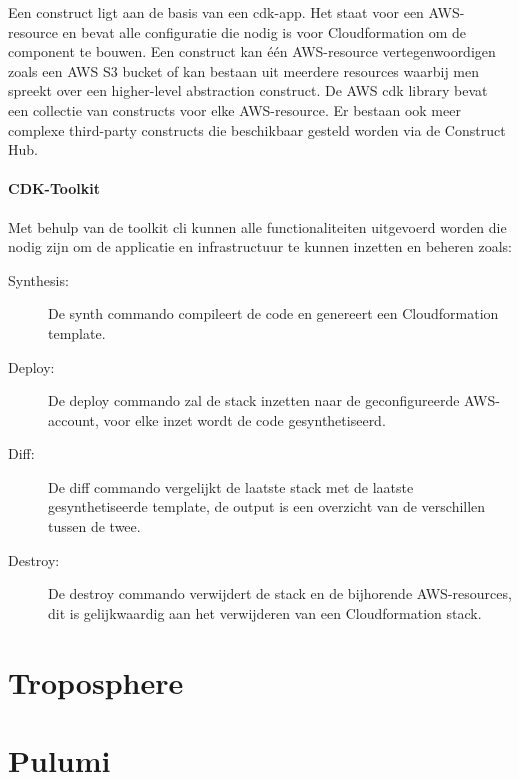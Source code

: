 Een construct ligt aan de basis van een \acrshort{cdk}-app.
Het staat voor een AWS-resource en bevat alle configuratie die nodig is voor Cloudformation om de component te bouwen.
Een construct kan één AWS-resource vertegenwoordigen zoals een AWS S3 bucket of kan bestaan uit meerdere resources waarbij men spreekt over een higher-level abstraction construct.
De AWS \acrshort{cdk} library bevat een collectie van constructs voor elke AWS-resource.
Er bestaan ook meer complexe third-party constructs die beschikbaar gesteld worden via de Construct Hub.

\paragraph{CDK-Toolkit}

Met behulp van de toolkit \acrshort{cli} kunnen alle functionaliteiten uitgevoerd worden die nodig zijn om de applicatie en infrastructuur te kunnen inzetten en beheren zoals:

\begin{description}
    \item[Synthesis:] De synth commando compileert de code en genereert een Cloudformation template.
    \item[Deploy:] De deploy commando zal de stack inzetten naar de geconfigureerde AWS-account, voor elke inzet wordt de code gesynthetiseerd.
    \item[Diff:] De diff commando vergelijkt de laatste stack met de laatste gesynthetiseerde template, de output is een overzicht van de verschillen tussen de twee.
    \item[Destroy:] De destroy commando verwijdert de stack en de bijhorende AWS-resources, dit is gelijkwaardig aan het verwijderen van een Cloudformation stack.
\end{description}

\section{Troposphere}
\label{sec:service-troposphere}


\section{Pulumi}
\label{sec:service-pulumi}

